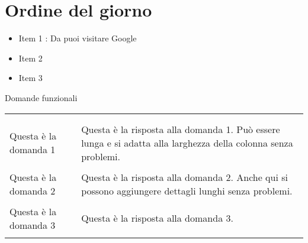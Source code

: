 \section{Ordine del giorno}

\begin{itemize}
    \item Item 1 : Da  puoi visitare Google
    \item Item 2
    \item Item 3
\end{itemize}

\vspace{2cm}

\begingroup
\renewcommand{\ni}{\noindent}

{\Large Domande funzionali}

\vspace{0.5cm}

\begin{tabular}{>{\justifying\arraybackslash}p{} >{\justifying\arraybackslash}p{}}
    \multicolumn{1}{c}{\textbf{Domande}} & \multicolumn{1}{c}{\textbf{Risposte}} \\ \\
    \ni Questa è la domanda 1 & \ni Questa è la risposta alla domanda 1. Può essere lunga e si adatta alla larghezza della colonna senza problemi. \\ \\
    \ni Questa è la domanda 2 & \ni Questa è la risposta alla domanda 2. Anche qui si possono aggiungere dettagli lunghi senza problemi. \\ \\
    \ni Questa è la domanda 3 & \ni Questa è la risposta alla domanda 3. \\ \\
\end{tabular}

\endgroup